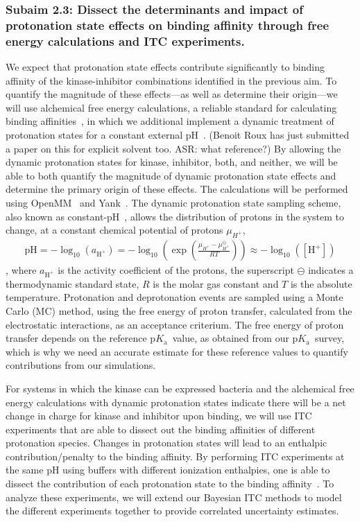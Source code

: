 \documentclass[10pt,final]{article}
\newcommand{\pKa}{p$K_\mathrm{a}$\ }
\newcommand{\pH}{p$\mathrm{H}$\ }
\begin{document}
\subsubsection*{Subaim 2.3: Dissect the determinants and impact of protonation state effects on binding affinity through free energy calculations and ITC experiments.}
We expect that protonation state effects contribute significantly to binding affinity of the kinase-inhibitor combinations identified in the previous aim.
%
To quantify the magnitude of these effects---as well as determine their origin---we will use alchemical free energy calculations, a reliable standard for calculating binding affinities~\autocite{Fujitani2005a,Deng2006a,Wang2015a}, in which we additional implement a dynamic treatment of protonation states for a constant external pH~\autocite{Mongan2004a,Stern2007a,Nilmeier2011a}.
%
{\color{purple}(Benoit Roux has just submitted a paper on this for explicit solvent too. ASR: what reference?)}
%
By allowing the dynamic protonation states for kinase, inhibitor, both, and neither, we will be able to both quantify the magnitude of dynamic protonation state effects and determine the primary origin of these effects.
%
The calculations will be performed using OpenMM~\autocite{Eastman2013a} and Yank~\autocite{Chodera2015a}.
%
The dynamic protonation state sampling scheme, also known as constant-\pH, allows the distribution of protons in the system to change, at a constant chemical potential of protons $\mu_{H^+}$,
\begin{align}
 \text{p}\mathrm{H} = -\log_{10}\left( a_{\mathrm{H}^+} \right) = -\log_{10}\left( \exp\left(\frac{\mu_{H^+} -\mu_{H^+}^\ominus}{RT}\right)\right) \approx -\log_{10}\left( [\mathrm{H}^+] \right) 
\end{align}
, where $a_{\mathrm{H}^+}$ is the activity coefficient of the protons, the superscript $\ominus$ indicates a thermodynamic standard state, $R$ is the molar gas constant and $T$ is the absolute temperature.
%
Protonation and deprotonation events are sampled using a Monte Carlo (MC) method, using the free energy of proton transfer, calculated from the electrostatic interactions, as an acceptance criterium.
%
The free energy of proton transfer depends on the reference \pKa value, as obtained from our \pKa survey, which is why we need an accurate estimate for these reference values to quantify contributions from our simulations.
%

For systems in which the kinase can be expressed bacteria and the alchemical free energy calculations with dynamic protonation states indicate there will be a net change in charge for kinase and inhibitor upon binding, we will use ITC experiments that are able to dissect out the binding affinities of different protonation species.
%
Changes in protonation states will lead to an enthalpic contribution/penalty to the binding affinity.
%
By performing ITC experiments at the same pH using buffers with different ionization enthalpies, one is able to dissect the contribution of each protonation state to the binding affinity~\autocite{Baker1996a,Neeb2014a}.
%
To analyze these experiments, we will extend our Bayesian ITC methods to model the different experiments together to provide correlated uncertainty estimates.
\end{document}
